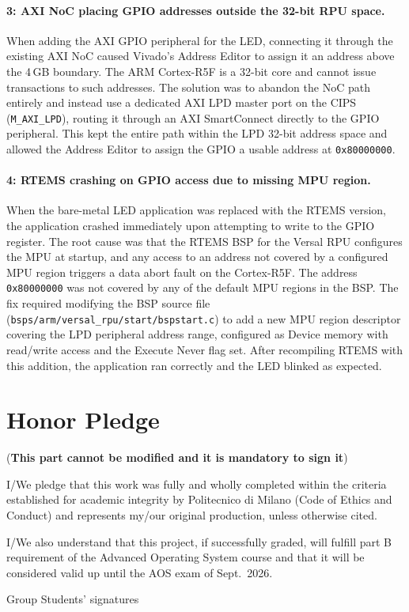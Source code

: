 \documentclass[10pt,a4]{article}
\begin{document}
\paragraph{3: AXI NoC placing GPIO addresses outside the 32-bit RPU space.}
When adding the AXI GPIO peripheral for the LED, connecting it through the
existing AXI NoC caused Vivado's Address Editor to assign it an address above
the 4\,GB boundary.
The ARM Cortex-R5F is a 32-bit core and cannot issue transactions to such
addresses.
The solution was to abandon the NoC path entirely and instead use a dedicated
AXI LPD master port on the CIPS (\texttt{M\_AXI\_LPD}), routing it through an
AXI SmartConnect directly to the GPIO peripheral.
This kept the entire path within the LPD 32-bit address space and allowed
the Address Editor to assign the GPIO a usable address at \texttt{0x80000000}.

\paragraph{4: RTEMS crashing on GPIO access due to missing MPU region.}
When the bare-metal LED application was replaced with the RTEMS version, the
application crashed immediately upon attempting to write to the GPIO register.
The root cause was that the RTEMS BSP for the Versal RPU configures the MPU
at startup, and any access to an address not covered by a configured MPU region
triggers a data abort fault on the Cortex-R5F.
The address \texttt{0x80000000} was not covered by any of the default MPU
regions in the BSP.
The fix required modifying the BSP source file
(\texttt{bsps/arm/versal\_rpu/start/bspstart.c}) to add a new MPU region
descriptor covering the LPD peripheral address range, configured as Device
memory with read/write access and the Execute Never flag set.
After recompiling RTEMS with this addition, the application ran correctly and
the LED blinked as expected.


\section{Honor Pledge}

(\textbf{This part cannot be modified and it is mandatory to sign it})

I/We pledge that this work was fully and wholly completed within the criteria
established for academic integrity by Politecnico di Milano (Code of Ethics and
Conduct) and represents my/our original production, unless otherwise cited.

I/We also understand that this project, if successfully graded, will fulfill
part B requirement of the Advanced Operating System course and that it will be
considered valid up until the AOS exam of Sept.\ 2026.

\begin{flushright}
Group Students' signatures
\end{flushright}
\end{document}
